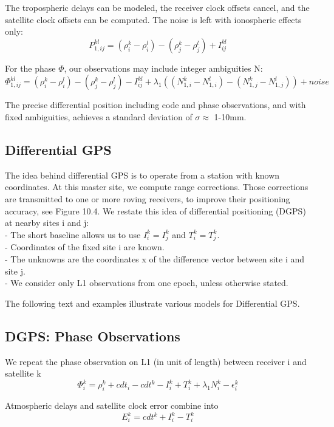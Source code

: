 The tropospheric delays can be modeled, the receiver clock offsets cancel, and the satellite clock offsets can be computed. The noise is left with ionospheric effects only:
$$
P_{1,ij}^{kl}=(\rho_{i}^{k}-\rho_{i}^{l})-(\rho_{j}^{k}-\rho_{j}^{l})+I_{ij}^{kl}
$$

For the phase $\Phi$, our observations may include integer ambiguities N:
$$
\Phi_{1,ij}^{kl}=(\rho_{i}^{k}-\rho_{i}^{l})-(\rho_{j}^{k}-\rho_{j}^{l})-I_{ij}^{kl}+\lambda_{1}((N_{1,i}^{k}-N_{1,i}^{l})-(N_{1,j}^{k}-N_{1,j}^{l}))+noise
$$

The precise differential position including code and phase observations, and with fixed ambiguities, achieves a standard deviation of $\sigma \approx$ 1-10mm.

\subsection{Differential GPS}

The idea behind differential GPS is to operate from a station with known coordinates. At this master site, we compute range corrections. Those corrections are transmitted to one or more roving receivers, to improve their positioning accuracy, see Figure 10.4. We restate this idea of differential positioning (DGPS) at nearby sites i and j:\\
- The short baseline allows us to use $I_{i}^{k}=I_{j}^{k}$ and $T_{i}^{k}=T_{j}^{k}$.\\
- Coordinates of the fixed site i are known.\\
- The unknowns are the coordinates x of the difference vector between site i and site j.\\
- We consider only L1 observations from one epoch, unless otherwise stated.

The following text and examples illustrate various models for Differential GPS.

\subsection{DGPS: Phase Observations}

We repeat the phase observation on L1 (in unit of length) between receiver i and satellite k
\begin{equation}
\Phi_{i}^{k}=\rho_{i}^{k}+cdt_{i}-cdt^{k}-I_{i}^{k}+T_{i}^{k}+\lambda_{1}N_{i}^{k}-\epsilon_{i}^{k}
\end{equation}

Atmospheric delays and satellite clock error combine into
\begin{equation}
E_{i}^{k}=cdt^{k}+I_{i}^{k}-T_{i}^{k}
\end{equation}

